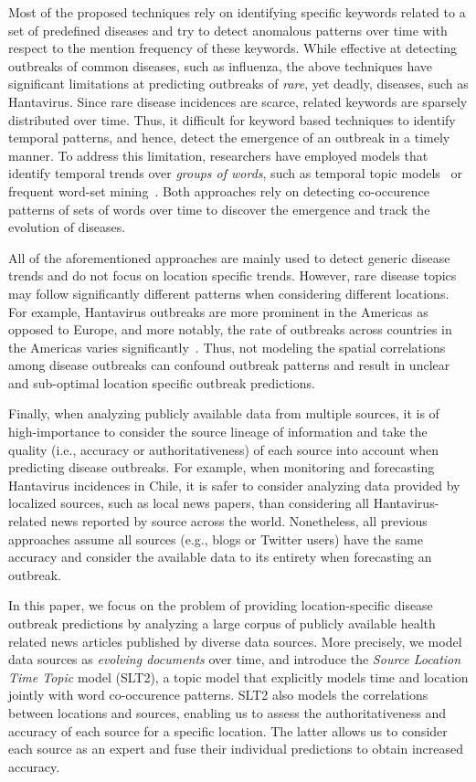 \documentclass{sig-alternate}
\newcommand{\model}{{SLT2}\xspace} %
\begin{document}
Most of the proposed techniques rely on identifying specific keywords related to a set of predefined diseases and try to detect anomalous patterns over time with respect to the mention frequency of these keywords. While effective at detecting outbreaks of common diseases, such as influenza, the above techniques have significant limitations at predicting outbreaks of {\em rare}, yet deadly, diseases, such as Hantavirus. Since rare disease incidences are scarce, related keywords are sparsely distributed over time. Thus, it difficult for keyword based techniques to identify temporal patterns, and hence, detect the emergence of an outbreak in a timely manner. To address this limitation, researchers have employed models that identify temporal trends over {\em groups of words}, such as temporal topic models~\cite{paul:11} or frequent word-set mining~\cite{parker:13}. Both approaches rely on detecting co-occurence patterns of sets of words over time to discover the emergence and track the evolution of diseases. 

All of the aforementioned approaches are mainly used to detect generic disease trends and do not focus on location specific trends. However, rare disease topics may follow significantly different patterns when considering different locations. For example, Hantavirus outbreaks are more prominent in the Americas as opposed to Europe, and more notably, the rate of outbreaks across countries in the Americas varies significantly~\cite{jonsson:10}. Thus, not modeling the spatial correlations among disease outbreaks can confound outbreak patterns and result in unclear and sub-optimal location specific outbreak predictions. 

Finally, when analyzing publicly available data from multiple sources, it is of high-importance to consider the source lineage of information and take the quality (i.e., accuracy or authoritativeness) of each source into account when predicting disease outbreaks. For example, when monitoring and forecasting Hantavirus incidences in Chile, it is safer to consider analyzing data provided by localized sources, such as local news papers, than considering all Hantavirus-related news reported by source across the world. Nonetheless, all previous approaches assume all sources (e.g., blogs or Twitter users) have the same accuracy and consider the available data to its entirety when forecasting an outbreak. 

In this paper, we focus on the problem of providing location-specific disease outbreak predictions by analyzing a large corpus of publicly available health related news articles published by diverse data sources. More precisely, we model data sources as {\em evolving documents} over time, and introduce the {\em Source Location Time Topic} model (\model), a topic  model that explicitly models time and location jointly with word co-occurence patterns. \model also models the correlations between locations and sources, enabling us to assess the authoritativeness and accuracy of each source for a specific location. The latter allows us to consider each source as an expert and fuse their individual predictions to obtain increased accuracy. 
\end{document}
